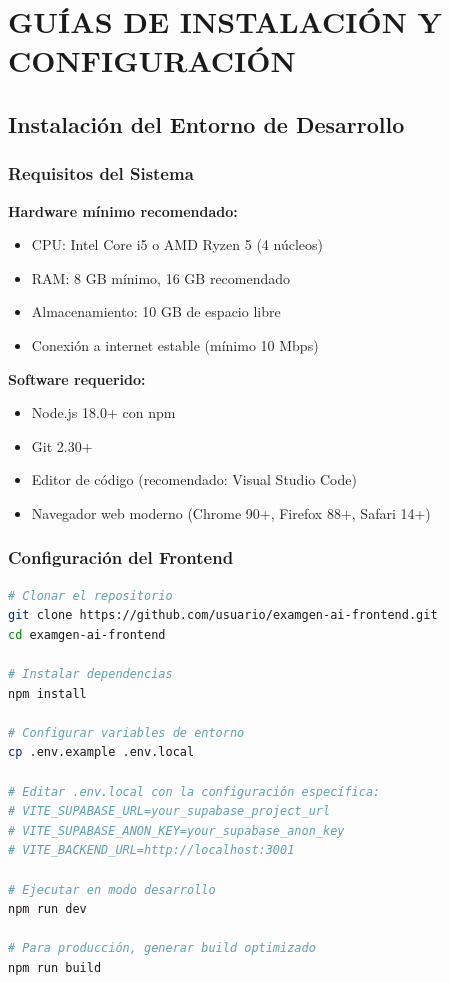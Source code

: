 \documentclass[12pt,a4paper]{report}
\begin{document}
\chapter{GUÍAS DE INSTALACIÓN Y CONFIGURACIÓN}

\section{Instalación del Entorno de Desarrollo}

\subsection{Requisitos del Sistema}

\textbf{Hardware mínimo recomendado:}
\begin{itemize}
\item CPU: Intel Core i5 o AMD Ryzen 5 (4 núcleos)
\item RAM: 8 GB mínimo, 16 GB recomendado
\item Almacenamiento: 10 GB de espacio libre
\item Conexión a internet estable (mínimo 10 Mbps)
\end{itemize}

\textbf{Software requerido:}
\begin{itemize}
\item Node.js 18.0+ con npm
\item Git 2.30+
\item Editor de código (recomendado: Visual Studio Code)
\item Navegador web moderno (Chrome 90+, Firefox 88+, Safari 14+)
\end{itemize}

\subsection{Configuración del Frontend}

\begin{lstlisting}[language=bash, caption=Instalación y configuración del frontend]
# Clonar el repositorio
git clone https://github.com/usuario/examgen-ai-frontend.git
cd examgen-ai-frontend

# Instalar dependencias
npm install

# Configurar variables de entorno
cp .env.example .env.local

# Editar .env.local con la configuración específica:
# VITE_SUPABASE_URL=your_supabase_project_url
# VITE_SUPABASE_ANON_KEY=your_supabase_anon_key
# VITE_BACKEND_URL=http://localhost:3001

# Ejecutar en modo desarrollo
npm run dev

# Para producción, generar build optimizado
npm run build
\end{lstlisting}
\end{document}

